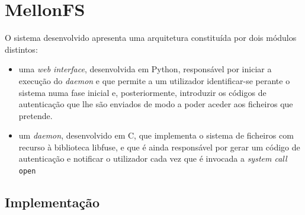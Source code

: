 \documentclass{article}
\begin{document}
\section{MellonFS}
O sistema desenvolvido apresenta uma arquitetura constituída por dois módulos distintos: 
\begin{itemize}
    \item uma \textit{web interface}, desenvolvida em Python, responsável por iniciar a execução do \textit{daemon} e que permite a um utilizador 
    identificar-se perante o sistema numa fase inicial e, posteriormente, introduzir os códigos de autenticação que lhe são enviados de modo a 
    poder aceder aos ficheiros que pretende.
    \item um \textit{daemon}, desenvolvido em C, que implementa o sistema de ficheiros com recurso à biblioteca libfuse, e que é ainda responsável 
    por gerar um código de autenticação e notificar o utilizador cada vez que é invocada a \textit{system call} \texttt{open}
\end{itemize}

\subsection{Implementação}
\end{document}
